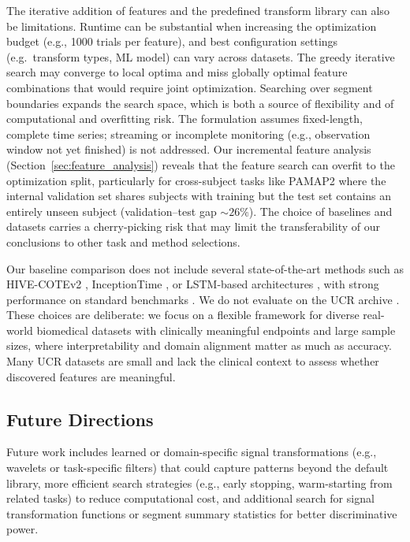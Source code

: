 \documentclass[times, review, 10pt]{elsarticle}
\begin{document}
The iterative addition of features and the predefined transform library can also be limitations. Runtime can be
substantial when increasing the optimization budget (e.g., 1000 trials per feature), and
best configuration settings (e.g.\ transform types, ML model) can vary across
datasets. The greedy iterative search may converge to local optima and miss globally
optimal feature combinations that would require joint optimization. Searching over
segment boundaries expands the search space, which is both a source of
flexibility and of computational and overfitting risk. The formulation assumes
fixed-length, complete time series; streaming or incomplete monitoring (e.g., observation window not yet finished) is not addressed. Our
incremental feature analysis (Section~\ref{sec:feature_analysis}) reveals that the
feature search can overfit to the optimization split, particularly for cross-subject
tasks like PAMAP2 where the internal validation set shares subjects with training but
the test set contains an entirely unseen subject (validation--test gap
${\sim}26\%$). The choice of baselines and datasets carries a cherry-picking risk that
may limit the transferability of our conclusions to other task and method selections.

Our baseline comparison does not include several state-of-the-art methods such as HIVE-COTEv2
\cite{middlehurst2021hivecote2}, InceptionTime \cite{fawaz2020inceptiontime}, or LSTM-based architectures \cite{ordonez2016deep_activity}, with strong performance on
standard benchmarks \cite{middlehurst2024bakeoff}. We do not
evaluate on the UCR archive \cite{dau2019ucr}. These choices are deliberate: 
we focus on a flexible framework for diverse real-world biomedical datasets with clinically meaningful endpoints and large sample sizes, 
where interpretability and domain alignment matter as much as accuracy.
Many UCR datasets are small and lack the clinical context to assess whether discovered features are meaningful.

\subsection{Future Directions}

Future work includes learned or domain-specific signal transformations (e.g.,
wavelets or task-specific filters) that could capture patterns beyond the default
library, more efficient search strategies (e.g., early stopping, warm-starting from
related tasks) to reduce computational cost, and additional search for signal
transformation functions or segment summary statistics for better discriminative
power.
\end{document}
